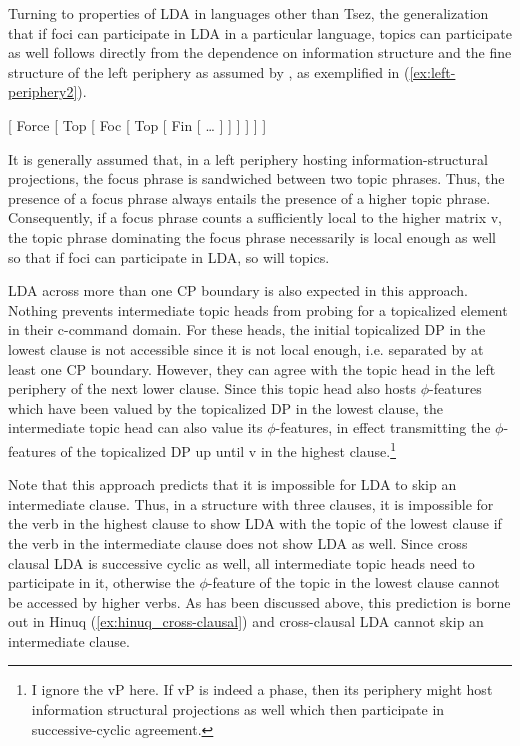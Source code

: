 \documentclass[output=paper
,modfonts
,nonflat]{langsci/langscibook}
\begin{document}
Turning to properties of LDA in languages other than Tsez, the generalization that if foci can participate in LDA in a particular language, topics can participate as well follows directly from the dependence on information structure and the fine structure of the left periphery as assumed by \citet{Rizzi1997}, as exemplified in (\ref{ex:left-periphery2}).
\begin{exe} 
	\ex\label{ex:left-periphery2} {[} Force [ Top [ Foc [ Top [ Fin [ {\ldots} ] ] ] ] ] ] 
\end{exe}
It is generally assumed that, in a left periphery hosting information-structural projections, the focus phrase is sandwiched between two topic phrases. Thus, the presence of a focus phrase always entails the presence of a higher topic phrase. Consequently, if a focus phrase counts a sufficiently local to the higher matrix v, the  topic phrase dominating the focus phrase necessarily is local enough as well so that if foci can participate in LDA, so will topics.\largerpage[-3]

LDA across more than one CP boundary is also expected in this approach. Nothing prevents intermediate topic heads from probing for a topicalized element in their c-command domain. For these heads, the initial topicalized DP in the lowest clause is not accessible since it is not local enough, i.e. separated by at least one CP boundary. However, they can agree with the topic head in the left periphery of the next lower clause. Since this topic head also hosts $ \phi $-features which have been valued by the topicalized DP in the lowest clause, the intermediate topic head can also value its $ \phi $-features, in effect transmitting the $ \phi $-features of the topicalized DP up until v in the highest clause.\footnote{I ignore the vP here. If vP is indeed a phase, then its periphery might host information structural projections as well which then participate in successive-cyclic agreement.}

Note that this approach predicts that it is impossible for LDA to skip an intermediate clause. Thus, in a structure with three clauses, it is impossible for the verb in the highest clause to show LDA with the topic of the lowest clause if the verb in the intermediate clause does not show LDA as well. Since cross clausal LDA is successive cyclic as well, all intermediate topic heads need to participate in it, otherwise the $ \phi $-feature of the topic in the lowest clause cannot be accessed by higher verbs. As has been discussed above, this prediction is borne out in Hinuq (\ref{ex:hinuq_cross-clausal}) and cross-clausal LDA cannot skip an intermediate clause.
\end{document}
